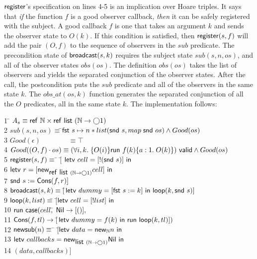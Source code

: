\documentclass[preprint,natbib]{sigplanconf}
\begin{document}
$\mbox{\textsf{{register}}}$'s specification on lines 4-5 is an implication over
Hoare triples. It says that \emph{if} the function $f$ is a good
observer callback, \emph{then} it can be safely registered with the
subject. A good callback $f$ is one that takes an argument $k$ and
sends the observer state to $O(k)$. If this condition is satisfied,
then $\mbox{\textsf{{register}}}(s, f)$ will add the pair $(O,f)$ to the
sequence of observers in the $sub$ predicate.
%
The precondition state of $\mbox{\textsf{{broadcast}}}(s,k)$ requires the
subject state $sub(s,n,os)$, and all of the observer states
$obs(os)$. The definition $obs(os)$ takes the list of observers and
yields the separated conjunction of the observer states. After the
call, the postcondition puts the $sub$ predicate and all of the
observers in the same state $k$. The $obs\_at(os,k)$ function
generates the separated conjunction of all the $O$ predicates, all in
the same state $k$. The implementation follows:
{\small
\begin{tabbing}
1 \qquad \= $A_s \equiv \mbox{\textsf{{ref }}}\mathbb{N} \times \mbox{\textsf{{ref }}}\mbox{\textsf{{list }}}{(\mathbb{N}\to \bigcirc{1})}$
\\[0.5em]
2 \> $sub(s, n, os) \equiv$\=$ \mbox{\textsf{{fst }}} s \mapsto n * 
              list(\mbox{\textsf{{snd }}} s, map\; \mbox{\textsf{{snd }}} os) \land Good(os)$ 
\\[0.5em]
3 \> $Good(\epsilon) \!\qquad\qquad \equiv \top$ \\
4 \> $Good((O,f)\cdot os) \equiv 
{(\forall i,k.\; \{{O(i)}\}{\mbox{\textsf{{run }}}{f(k)}}\{{a:1}.\;{O(k)}\})}\mbox{\textsf{{ valid}}}
      \land Good(os)$ 
\\[0.5em]
5 \> $\mbox{\textsf{{register}}}(s, f) \equiv$ \=
         $[$\= $\mbox{\textsf{{letv }}}cell = [!(\mbox{\textsf{{snd }}} s)]\mbox{\textsf{{ in }}}$ \\
6 \> \> \> $\mbox{\textsf{{letv }}}r = [\mbox{\textsf{{new}}}_{\mbox{\textsf{{ref }}}\mbox{\textsf{{list }}}{(\mathbb{N}\to \bigcirc{1})}} cell]\mbox{\textsf{{ in }}}$ \\
7 \> \> \> $\mbox{\textsf{{snd }}} s := \mbox{\textsf{{Cons}}}(f, r)]$
\\[0.5em]

8  \> $\mbox{\textsf{{broad}}} \mbox{\textsf{{cast}}}(s, k) \equiv
[$\=$\mbox{\textsf{{letv }}}dummy = [\mbox{\textsf{{fst }}} s := k]\mbox{\textsf{{ in }}}\mbox{\textsf{{loop}}}(k, \mbox{\textsf{{snd }}} s)]$ \\


9 \> $\mbox{\textsf{{loop}}}(k, list) \equiv $\=
         $[$\=$\mbox{\textsf{{letv }}}cell = [!list]\mbox{\textsf{{ in }}}$ \\
10 \>\>\> $\mbox{\textsf{{run }}}{}\mbox{\textsf{{case}}}(cell,$\= 
            $\mbox{\textsf{{Nil}}} \to [()],$ \\
11 \>\>\>\> $\mbox{\textsf{{Cons}}}(f, tl) \to [$\=$\mbox{\textsf{{letv }}}dummy = f(k)\mbox{\textsf{{ in }}}\mbox{\textsf{{run }}}{\mbox{\textsf{{loop}}}(k,tl)}])$ \\[0.5em]
12 \> $\mbox{\textsf{{new}}}\mbox{\textsf{{sub}}}(n) \equiv$ \=
          $[$\=$\mbox{\textsf{{letv }}}data = \mbox{\textsf{{new}}}_{\mathbb{N}} n\mbox{\textsf{{ in }}}$ \\
13 \> \> \> $\mbox{\textsf{{letv }}}callbacks = \mbox{\textsf{{new}}}_{\mbox{\textsf{{list }}}{(\mathbb{N}\to \bigcirc{1})}} \mbox{\textsf{{Nil}}}\mbox{\textsf{{ in }}}$ \\
14 \> \> \> $(data, callbacks)]$
\end{tabbing}
}
\end{document}

